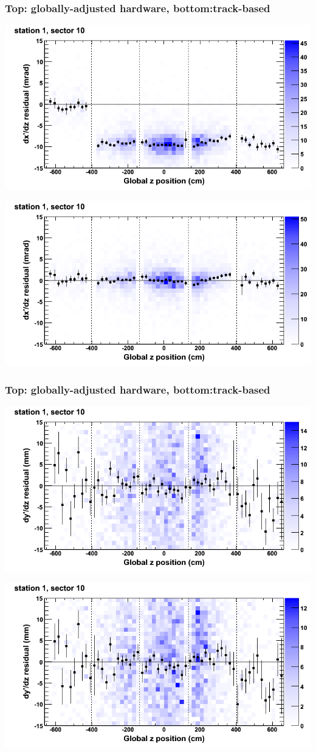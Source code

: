 \documentclass[compress]{beamer}
\begin{document}
\begin{frame}
\frametitle{Top: globally-adjusted hardware, bottom:track-based}
\includegraphics[width=0.7\linewidth]{NOV4_mapplots_HW/DTvsz_st1sec10_dxdz.png}

\includegraphics[width=0.7\linewidth]{NOV4_mapplots/DTvsz_st1sec10_dxdz.png}
\end{frame}

\begin{frame}
\frametitle{Top: globally-adjusted hardware, bottom:track-based}
\includegraphics[width=0.7\linewidth]{NOV4_mapplots_HW/DTvsz_st1sec10_dydz.png}

\includegraphics[width=0.7\linewidth]{NOV4_mapplots/DTvsz_st1sec10_dydz.png}
\end{frame}
\end{document}
